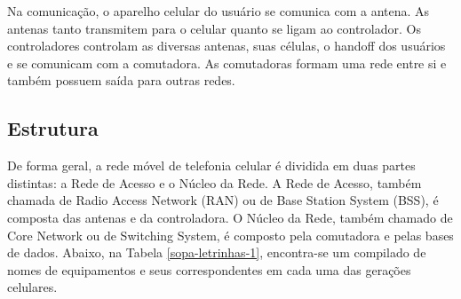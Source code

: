 \documentclass[11pt,oneside,a4paper]{abntex2}
\begin{document}
Na comunicação, o aparelho celular do usuário se comunica com a antena. As antenas tanto transmitem para o celular quanto se ligam ao controlador. Os controladores controlam as diversas antenas, suas células, o handoff dos usuários e se comunicam com a comutadora. As comutadoras formam uma rede entre si e também possuem saída para outras redes.

\subsection*{Estrutura}

De forma geral, a rede móvel de telefonia celular é dividida em duas partes distintas: a Rede de Acesso e o Núcleo da Rede. A Rede de Acesso, também chamada de Radio Access Network (RAN) ou de Base Station System (BSS), é composta das antenas e da controladora. O Núcleo da Rede, também chamado de Core Network ou de Switching System, é composto pela comutadora e pelas bases de dados. Abaixo, na Tabela \ref{sopa-letrinhas-1}, encontra-se um compilado de nomes de equipamentos e seus correspondentes em cada uma das gerações celulares.
\end{document}

